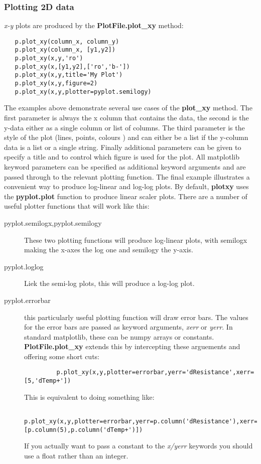 \documentclass[a4paper,11pt]{scrartcl}
\begin{document}
\subsubsection{Plotting 2D data}

\textit{x-y} plots are produced by the \textbf{PlotFile.plot\_xy} method:

\begin{lstlisting}
   p.plot_xy(column_x, column_y)
   p.plot_xy(column_x, [y1,y2])
   p.plot_xy(x,y,'ro')
   p.plot_xy(x,[y1,y2],['ro','b-'])
   p.plot_xy(x,y,title='My Plot')
   p.plot_xy(x,y,figure=2)
   p.plot_xy(x,y,plotter=pyplot.semilogy)
\end{lstlisting}

The examples above demonstrate several use cases of the \textbf{plot\_xy} method. The first parameter is always the x column that contains the data, the second is the y-data either as a single column or list of columns. The third parameter is the style of the plot (lines, points, colours \etc) and can either be a list if the y-column data is a list or a single string. Finally additional parameters can be given to specify a title and to control which figure is used for the plot. All matplotlib keyword parameters can be specified as additional keyword arguments and are passed through to the relevant plotting function. The final example illustrates a convenient way to produce log-linear and log-log plots. By default, \textbf{plotxy} uses the \textbf{pyplot.plot} function to produce linear scaler plots. There are a number of useful plotter functions that will work like this:
\begin{description}
  \item[pyplot.semilogx,pyplot.semilogy] These two plotting functions will produce log-linear plots, with semilogx making the x-axes the log one and semilogy the y-axis.
  \item[pyplot.loglog] Liek the semi-log plots, this will produce a log-log plot.
  \item[pyplot.errorbar] this particularly useful plotting function will draw error bars. The values for the error bars are passed as keyword arguments, \textit{xerr} or \textit{yerr}. In standard matplotlib, these can be numpy arrays or constants. \textbf{PlotFile.plot\_xy} extends this by intercepting these arguements and offering some short cuts:
      \begin{lstlisting}
         p.plot_xy(x,y,plotter=errorbar,yerr='dResistance',xerr=[5,'dTemp+'])
      \end{lstlisting}
      This is equivalent to doing something like:
       \begin{lstlisting}
         p.plot_xy(x,y,plotter=errorbar,yerr=p.column('dResistance'),xerr=[p.column(5),p.column('dTemp+')])
      \end{lstlisting}
    If you actually want to pass a constant to the \textit{x/yerr} keywords you should use a float rather than an integer.
\end{description}
\end{document}

